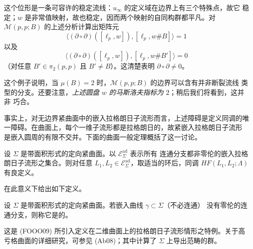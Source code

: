 这个位形是一条可容许的稳定流线：$u_\infty$ 的定义域在边界上有三个特殊点，故它
稳定；$w$ 是非常值映射，故也稳定，因而两个映射的自同构群都平凡。对
$\mathcal M(p,p;B)$ 的上述分析计算出矩阵元
\[
 \bigl\langle(\partial\circ\partial)([\ell_p,w]),[\ell_p,w\#B]\bigr\rangle=1
\]
以及
\[
 \bigl\langle(\partial\circ\partial)([\ell_p,w]),[\ell_p,w\#B']\bigr\rangle=0
\]
（对任意 $B'\in\pi_2(p,p)$ 且 $B'\neq B$）。这清楚表明
$\partial\circ\partial\neq0$。

这个例子说明，当 $\mu(B)=2$ 时，$\mathcal M(p,p;B)$ 的边界可以含有并非断裂流线
类型的分支。还要注意，\emph{上述圆盘 $w$ 的马斯洛夫指标为 $2$}；稍后我们将看到，这并非
巧合。

事实上，对无边界紧\personRiemann{}曲面中的嵌入拉格朗日子流形而言，上述障碍是定义\personFloer{}同调的唯一障碍。在曲面上，每个一维子流形都是拉格朗日的，故紧嵌入拉格朗日子流形
是嵌入圆周的有限不交并。下面的曲面一般定理概括了这一讨论。

\begin{theorem}
\label{thm:surface-unobstructed-floer}
设 $\Sigma$ 是带面积形式的定向紧曲面。以 $\mathcal E_\Sigma^{\mathrm{ad}}$ 表示所有
连通分支都非零伦的嵌入拉格朗日子流形之集合。则对任意
$L_1,L_2\in\mathcal E_\Sigma^{\mathrm{ad}}$，取适当的\personNovikov{}环后，\personFloer{}同调
$HF(L_1,L_2;\Lambda)$ 有良定义。
\end{theorem}

在此意义下给出如下定义。

\begin{definition}
\label{def:unobstructed-curve-surface}
设 $\Sigma$ 是带面积形式的定向紧曲面。若嵌入曲线 $\gamma\subset\Sigma$（不必连通）
没有零伦的连通分支，则称它是\termUnobstructed{}的。
\end{definition}

这是 (FOOO09) 所引入定义在二维曲面上的拉格朗日子流形情形之特例。关于高亏格曲面\termFukayaCategory{}的详细研究，可参见 (Ab08)；其中\personAbouzaid{}计算了 $\Sigma$ 上导出\personFukaya{}范畴的\personGrothendieck{}群。
